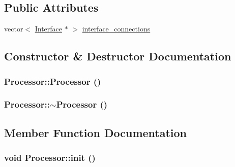 \subsection*{Public Attributes}
\begin{CompactItemize}
\item 
vector$<$ \hyperlink{classInterface}{Interface} $\ast$ $>$ \hyperlink{classProcessor_63351f5faee21f5b43dce853b117ea23}{interface\_\-connections}
\end{CompactItemize}


\subsection{Constructor \& Destructor Documentation}
\hypertarget{classProcessor_50c89dbf76a073f4fb491628258cf292}{
\subsubsection[{Processor}]{\setlength{\rightskip}{0pt plus 5cm}Processor::Processor ()}}
\label{classProcessor_50c89dbf76a073f4fb491628258cf292}


\hypertarget{classProcessor_cf37952c5b420d4e903a512571678692}{
\subsubsection[{$\sim$Processor}]{\setlength{\rightskip}{0pt plus 5cm}Processor::$\sim$Processor ()}}
\label{classProcessor_cf37952c5b420d4e903a512571678692}




\subsection{Member Function Documentation}
\hypertarget{classProcessor_22e869ee49d974ad0ee7ee81961ab88f}{
\subsubsection[{init}]{\setlength{\rightskip}{0pt plus 5cm}void Processor::init ()}}
\label{classProcessor_22e869ee49d974ad0ee7ee81961ab88f}




